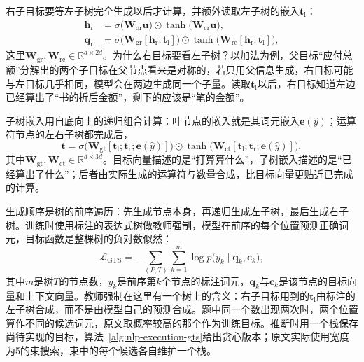 右子目标要等左子树完全生成以后才计算，并额外读取左子树的嵌入$\bm{t}_{\mathrm{l}}$：
\begin{equation}
  \begin{aligned}
  \bm{h}_{\mathrm{r}}&=\sigma\bigl(\bm{W}_{\mathrm{or}}\bm{u}\bigr)\odot\tanh\bigl(\bm{W}_{\mathrm{cr}}\bm{u}\bigr),\\
  \bm{q}_{\mathrm{r}}&=\sigma\bigl(\bm{W}_{\mathrm{gr}}[\bm{h}_{\mathrm{r}};\bm{t}_{\mathrm{l}}]\bigr)\odot\tanh\bigl(\bm{W}_{\mathrm{re}}[\bm{h}_{\mathrm{r}};\bm{t}_{\mathrm{l}}]\bigr),
  \end{aligned}
  \label{eq:nlp-execution-gts-right}
\end{equation}
这里$\bm{W}_{\mathrm{gr}},\bm{W}_{\mathrm{re}}\in\mathbb{R}^{d\times2d}$。为什么右目标要看左子树？以加法为例，父目标“应付总额”分解出的两个子目标在父节点看来是对称的，若只用父信息生成，右目标可能与左目标几乎相同，模型会在两边生成同一个子量。读取$\bm{t}_{\mathrm{l}}$以后，右目标知道左边已经算出了“书的折后金额”，剩下的应该是“笔的金额”。

子树嵌入用自底向上的递归组合计算：叶节点的嵌入就是其词元嵌入$\bm{e}(\hat y)$；运算符节点的左右子树都完成后，
\begin{equation}
  \bm{t}=\sigma\bigl(\bm{W}_{\mathrm{gt}}[\bm{t}_{\mathrm{l}};\bm{t}_{\mathrm{r}};\bm{e}(\hat y)]\bigr)\odot
  \tanh\bigl(\bm{W}_{\mathrm{ct}}[\bm{t}_{\mathrm{l}};\bm{t}_{\mathrm{r}};\bm{e}(\hat y)]\bigr),
  \label{eq:nlp-execution-gts-comb}
\end{equation}
其中$\bm{W}_{\mathrm{gt}},\bm{W}_{\mathrm{ct}}\in\mathbb{R}^{d\times3d}$。目标向量描述的是“打算算什么”，子树嵌入描述的是“已经算出了什么”；后者由实际生成的运算符与数量合成，比目标向量更贴近已完成的计算。

生成顺序是树的前序遍历：先生成节点本身，再递归生成左子树，最后生成右子树。训练时使用标注的表达式树做教师强制，模型在前序的每个位置预测正确词元，目标函数是整棵树的负对数似然：
\begin{equation}
  \mathcal{L}_{\mathrm{GTS}}=-\sum_{(P,T)}\sum_{k=1}^{m}\log p\bigl(y_k\mid\bm{q}_k,\bm{c}_k\bigr),
  \label{eq:nlp-execution-gts-loss}
\end{equation}
其中$m$是树$T$的节点数，$y_k$是前序第$k$个节点的标注词元，$\bm{q}_k$与$\bm{c}_k$是该节点的目标向量和上下文向量。教师强制在这里有一个树上的含义：右子目标用到的$\bm{t}_{\mathrm{l}}$由标注的左子树合成，而不是由模型自己的预测合成。题中同一个数出现两次时，两个位置算作不同的候选词元，原文取概率较高的那个作为训练目标。推断时用一个栈保存尚待实现的目标，算法~\ref{alg:nlp-execution-gts}给出贪心版本；原文实际使用宽度为5的束搜索，束中的每个候选各自维护一个栈。

